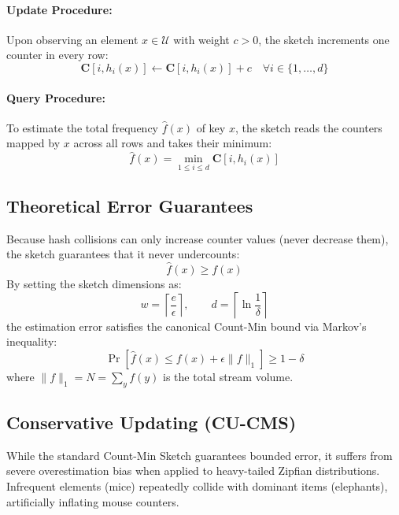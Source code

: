 \paragraph{Update Procedure:} Upon observing an element $x \in \mathcal{U}$ with weight $c > 0$, the sketch increments one counter in every row:
\begin{equation}
    \mathbf{C}[i, h_i(x)] \leftarrow \mathbf{C}[i, h_i(x)] + c \quad \forall i \in \{1, \dots, d\}
\end{equation}

\paragraph{Query Procedure:} To estimate the total frequency $\hat{f}(x)$ of key $x$, the sketch reads the counters mapped by $x$ across all rows and takes their minimum:
\begin{equation}
    \hat{f}(x) = \min_{1 \le i \le d} \mathbf{C}[i, h_i(x)]
\end{equation}

\subsection{Theoretical Error Guarantees}
Because hash collisions can only increase counter values (never decrease them), the sketch guarantees that it never undercounts:
\begin{equation}
    \hat{f}(x) \ge f(x)
\end{equation}
By setting the sketch dimensions as:
\begin{equation}
    w = \left\lceil \frac{e}{\epsilon} \right\rceil, \qquad d = \left\lceil \ln \frac{1}{\delta} \right\rceil
\end{equation}
the estimation error satisfies the canonical Count-Min bound via Markov's inequality:
\begin{equation}
    \Pr\left[ \hat{f}(x) \le f(x) + \epsilon \|f\|_1 \right] \ge 1 - \delta
\end{equation}
where $\|f\|_1 = N = \sum_{y} f(y)$ is the total stream volume.

\subsection{Conservative Updating (CU-CMS)}
While the standard Count-Min Sketch guarantees bounded error, it suffers from severe overestimation bias when applied to heavy-tailed Zipfian distributions. Infrequent elements (mice) repeatedly collide with dominant items (elephants), artificially inflating mouse counters.

